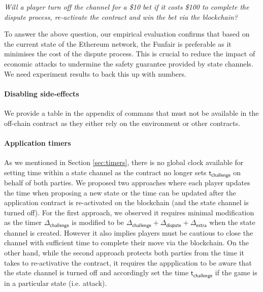 \documentclass{llncs}
\newcommand{\timerchallenge}{\mathsf{\Delta}_{\mathsf{challenge}}}
\newcommand{\timechallenge}{\mathsf{t}_{\mathsf{challenge}}}
\newcommand{\timerextra}{\mathsf{\Delta}_{\mathsf{extra}}}
\newcommand{\timerdispute}{\mathsf{\Delta}_{\mathsf{dispute}}}
\begin{document}
\begin{center}
\textit{Will a player turn off the channel for a \$10 bet if it costs \$100 to complete the dispute process, re-activate the contract and win the bet via the blockchain?} 
\end{center} 

To answer the above question, our empirical evaluation confirms that based on the current state of the Ethereum network, the Funfair is preferable as it minimises the cost of the dispute process. 
This is crucial to reduce the impact of economic attacks to undermine the safety guarantee provided by state channels. We need experiment results to back this up with numbers. 

\paragraph{Disabling side-effects} 
We provide a table in the appendix of commans that must not be available in the off-chain contract as they either rely on the environment or other contracts. 


\paragraph{Application timers} 
As we mentioned in Section \ref{sec:timers}, there is no global clock available for setting time within a state channel as the contract no longer sets $\timechallenge$ on behalf of both parties.
We proposed two approaches where each player updates the time when proposing a new state or the time can be updated after the application contract is re-activated on the blockchain (and the state channel is turned off).  
For the first approach, we observed it requires minimal modification as the timer $\timerchallenge$ is modified to be $\timerchallenge + \timerdispute + \timerextra$ when the state channel is created.
However it also implies players must be cautious to close the channel with sufficient time to complete their move via the blockchain.
On the other hand, while the second approach protects both parties from the time it takes to re-activative the contract, it requires the appplication to be aware that the state channel is turned off and accordingly set the time $\timechallenge$ if the game is in a particular state (i.e. attack). 
\end{document}
